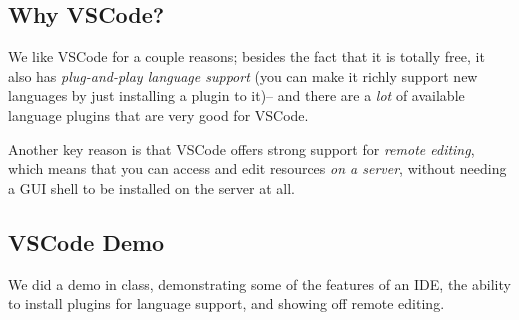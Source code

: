 \subsection{Why VSCode?}

We like VSCode for a couple reasons; besides the fact that it is totally free,
it also has {\em plug-and-play language support} (you can make it richly support
new languages by just installing a plugin to it)– and there are a {\em lot} of
available language plugins that are very good for VSCode.

Another key reason is that VSCode offers strong support for {\em remote editing},
which means that you can access and edit resources {\em on a server}, without
needing a GUI shell to be installed on the server at all.

\subsection{VSCode Demo}

We did a demo in class, demonstrating some of the features of an IDE, the
ability to install plugins for language support, and showing off remote editing.


